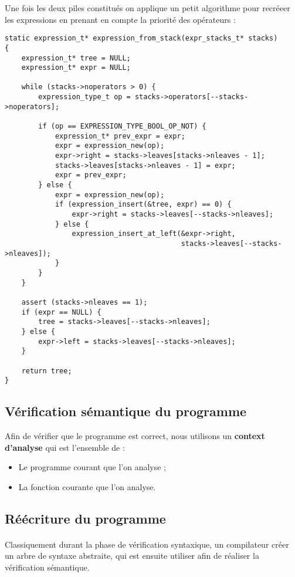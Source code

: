 Une fois les deux piles constitués on applique un petit algorithme pour recréeer
les expressions en prenant en compte la priorité des opérateurs :
\begin{verbatim}
static expression_t* expression_from_stack(expr_stacks_t* stacks)
{
    expression_t* tree = NULL;
    expression_t* expr = NULL;

    while (stacks->noperators > 0) {
        expression_type_t op = stacks->operators[--stacks->noperators];

        if (op == EXPRESSION_TYPE_BOOL_OP_NOT) {
            expression_t* prev_expr = expr;
            expr = expression_new(op);
            expr->right = stacks->leaves[stacks->nleaves - 1];
            stacks->leaves[stacks->nleaves - 1] = expr;
            expr = prev_expr;
        } else {
            expr = expression_new(op);
            if (expression_insert(&tree, expr) == 0) {
                expr->right = stacks->leaves[--stacks->nleaves];
            } else {
                expression_insert_at_left(&expr->right,
                                          stacks->leaves[--stacks->nleaves]);
            }
        }
    }

    assert (stacks->nleaves == 1);
    if (expr == NULL) {
        tree = stacks->leaves[--stacks->nleaves];
    } else {
        expr->left = stacks->leaves[--stacks->nleaves];
    }

    return tree;
}
\end{verbatim}

\subsection{Vérification sémantique du programme}

Afin de vérifier que le programme est correct, nous utilisons un
\textbf{context d'analyse} qui est l'ensemble de :
\begin{itemize}
    \item Le programme courant que l'on analyse ;
    \item La fonction courante que l'on analyse.
\end{itemize}


\subsection{Réécriture du programme}


\paragraph{}Classiquement durant la phase de vérification syntaxique, un compilateur créer un
arbre de syntaxe abstraite, qui est ensuite utiliser afin de réaliser la vérification sémantique.

